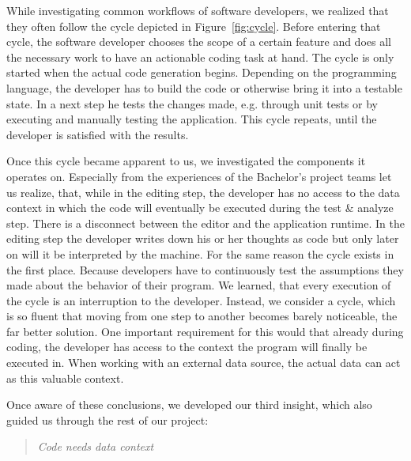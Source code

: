 While investigating common workflows of software developers, we realized that they often follow the cycle depicted in Figure~\ref{fig:cycle}. Before entering that cycle, the software developer chooses the scope of a certain feature and does all the necessary work to have an actionable coding task at hand. The cycle is only started when the actual code generation begins. Depending on the programming language, the developer has to build the code or otherwise bring it into a testable state. In a next step he tests the changes made, e.g. through unit tests or by executing and manually testing the application. This cycle repeats, until the developer is satisfied with the results.

Once this cycle became apparent to us, we investigated the components it operates on. Especially from the experiences of the Bachelor's project teams let us realize, that, while in the editing step, the developer has no access to the data context in which the code will eventually be executed during the test \& analyze step. There is a disconnect between the editor and the application runtime. In the editing step the developer writes down his or her thoughts as code but only later on will it be interpreted by the machine. For the same reason the cycle exists in the first place. Because developers have to continuously test the assumptions they made about the behavior of their program. We learned, that every execution of the cycle is an interruption to the developer. Instead, we consider a cycle, which is so fluent that moving from one step to another becomes barely noticeable, the far better solution. One important requirement for this would that already during coding, the developer has access to the context the program will finally be executed in. When working with an external data source, the actual data can act as this valuable context.

Once aware of these conclusions, we developed our third insight, which also guided us through the rest of our project:

\begin{quote}
\emph{Code needs data context}
\end{quote}